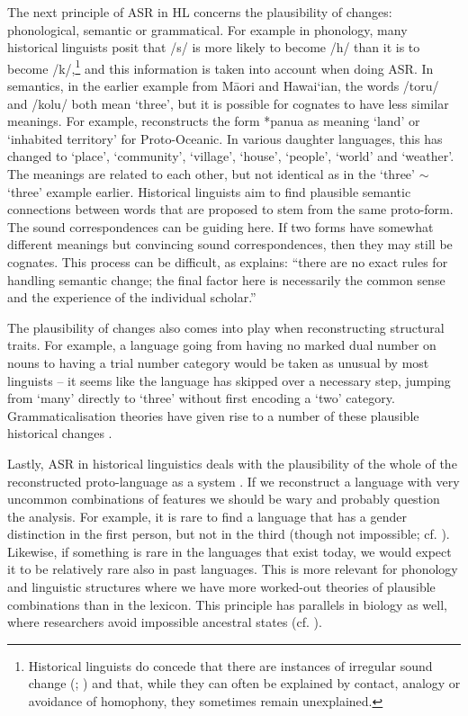 \documentclass[12pt,letterpaper]{article}
\begin{document}
The next principle of ASR in HL concerns the plausibility of changes: phonological, semantic or grammatical. For example in phonology, many historical linguists posit that /s/ is more likely to become /h/ than it is to become /k/,\footnote{Historical linguists do concede that there are instances of irregular sound change (\citealt{blust1996neogrammarian}; \citealt{campbell1996sound}) and that, while they can often be explained by contact, analogy or avoidance of homophony, they sometimes remain unexplained.} and this information is taken into account when doing ASR. In semantics, in the earlier example from M\={a}ori and Hawai`ian, the words /toru/ and /kolu/ both mean `three', but it is possible for cognates to have less similar meanings. For example, \citet{pawley2005meaning} reconstructs the form *panua as meaning `land' or `inhabited territory' for Proto-Oceanic. In various daughter languages, this has changed to `place', `community', `village', `house', `people', `world' and `weather'. The meanings are related to each other, but not identical as in the `three' $\sim$ `three' example earlier. Historical linguists aim to find plausible semantic connections between words that are proposed to stem from the same proto-form. The sound correspondences can be guiding here. If two forms have somewhat different meanings but convincing sound correspondences, then they may still be cognates. This process can be difficult, as \citet[229]{anttila1989historical} explains: ``there are no exact rules for handling semantic change; the final factor here is necessarily the common sense and the experience of the individual scholar.''  

The plausibility of changes also comes into play when reconstructing structural traits. For example, a language going from having no marked dual number on nouns to having a trial number category would be taken as unusual by most linguists \citep[cf.][8]{kikusawa_2006_pro_number} -- it seems like the language has skipped over a necessary step, jumping from `many' directly to `three' without first encoding a `two' category. Grammaticalisation theories have given rise to a number of these plausible historical changes \citep[594--595, 598]{heine2003grammaticalization}.

Lastly, ASR in historical linguistics deals with the plausibility of the whole of the reconstructed proto-language as a system \citep[1]{clark1973aspects}. If we reconstruct a language with very uncommon combinations of features we should be wary and probably question the analysis. For example, it is rare to find a language that has a gender distinction in the first person, but not in the third (though not impossible; cf. \citealt{wals-44}). Likewise, if something is rare in the languages that exist today, we would expect it to be relatively rare also in past languages. This is more relevant for phonology and linguistic structures where we have more worked-out theories of plausible combinations than in the lexicon. This principle has parallels in biology as well, where researchers avoid impossible ancestral states (cf. \citealt{schulmeister2004comparative}).
\end{document}
